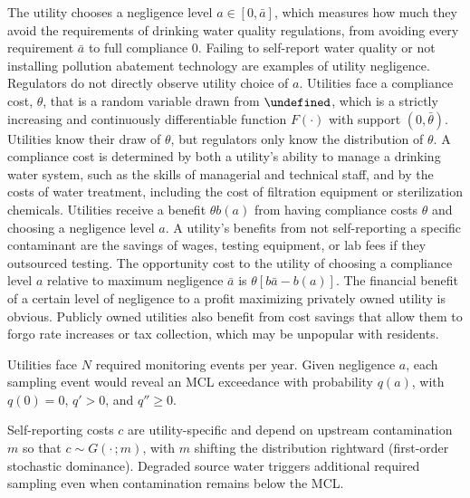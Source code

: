 \documentclass[12pt]{article}
\let\Theta\undefined
\begin{document}
The utility chooses a negligence level $a \in [0, \bar{a}]$, which measures how much they avoid the requirements of drinking water quality regulations, from avoiding every requirement $\bar{a}$ to full compliance 0. Failing to self-report water quality or not installing pollution abatement technology are examples of utility negligence. Regulators do not directly observe utility choice of $a$. Utilities face a compliance cost, $\theta$, that is a random variable drawn from $\Theta$, which is a strictly increasing and continuously differentiable function $F(\cdot)$ with support $(0, \bar{\theta})$. Utilities know their draw of $\theta$, but regulators only know the distribution of $\theta$. A compliance cost is determined by both a utility's ability to manage a drinking water system, such as the skills of managerial and technical staff, and by the costs of water treatment, including the cost of filtration equipment or sterilization chemicals. Utilities receive a benefit $\theta b(a)$ from having compliance costs $\theta$ and choosing a negligence level $a$. A utility's benefits from not self-reporting a specific contaminant are the savings of wages, testing equipment, or lab fees if they outsourced testing. The opportunity cost to the utility of choosing a compliance level $a$ relative to maximum negligence $\bar{a}$ is $\theta[b\bar{a}-b(a)]$. The financial benefit of a certain level of negligence to a profit maximizing privately owned utility is obvious. Publicly owned utilities also benefit from cost savings that allow them to forgo rate increases or tax collection, which may be unpopular with residents.

Utilities face $N$ required monitoring events per year. Given negligence $a$, each sampling event would reveal an MCL exceedance with probability $q(a)$, with $q(0)=0$, $q'>0$, and $q'' \ge 0$.


Self-reporting costs $c$ are utility-specific and depend on upstream contamination $m$ so that $c \sim G(\cdot\,;m)$, with $m$ shifting the distribution rightward (first-order stochastic dominance). Degraded source water triggers additional required sampling even when contamination remains below the MCL.
\end{document}
